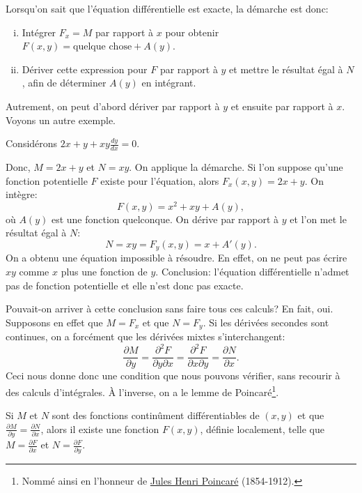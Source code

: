 Lorsqu'on sait que l'équation différentielle est exacte, la démarche est donc:
\begin{enumerate}[(i)]
	\item Intégrer $F_x = M$ par rapport à $x$ pour obtenir $F(x, y) = \text{quelque chose} + A(y)$.
	\item Dériver cette expression pour $F$ par rapport à $y$ et mettre le résultat égal à
			$N$, afin de déterminer $A(y)$ en intégrant.
\end{enumerate}
Autrement, on peut d'abord dériver par rapport à $y$ et ensuite par rapport à $x$.
Voyons un autre exemple.

\begin{example}
	Considérons $2x+y + xy \frac{dy}{dx} = 0$.

	Donc, $M = 2x+y$ et $N=xy$.  On applique la démarche.
	Si l'on suppose qu'une fonction potentielle $F$ existe pour l'équation, alors $F_x (x,y) = 2x+y$.
	On intègre:
	\begin{equation*}
		F(x,y) = x^2 + xy + A(y),
	\end{equation*}
	où $A(y)$ est une fonction quelconque. On dérive par rapport à $y$ et l'on met le résultat égal à $N$:
	\begin{equation*}
		N = xy = F_y (x,y) = x+A'(y) .
	\end{equation*}
	On a obtenu une équation impossible à résoudre.  En effet, on ne peut pas écrire $xy$ comme
	$x$ plus une fonction de $y$.
	Conclusion: l'équation différentielle n'admet pas de fonction potentielle et elle n'est donc pas exacte.
\end{example}

Pouvait-on arriver à cette conclusion sans faire tous ces calculs?  En fait, oui.  Supposons en effet que
$M = F_x$ et que 
$N = F_y$.  Si les dérivées secondes sont continues, on a forcément que les dérivées mixtes s'interchangent:
\begin{equation*}
	\frac{\partial M}{\partial y}
		= 	\frac{\partial^2 F}{\partial y \partial x}
		=	\frac{\partial^2 F}{\partial x \partial y}
		= 	\frac{\partial N}{\partial x} .
\end{equation*}
Ceci nous donne donc une condition que nous pouvons vérifier, sans recourir à des calculs d'intégrales.
À l'inverse, on a le lemme de Poincaré\footnote{Nommé ainsi en l'honneur de
\href{https://en.wikipedia.org/wiki/Henri_Poincar\%C3\%A9}{Jules Henri
Poincaré} (1854-1912).}.

\begin{theorem}[Poincaré]
Si $M$ et $N$ sont des fonctions continûment différentiables de $(x, y)$ et
que $\frac{\partial M}{\partial y} = \frac{\partial N}{\partial x}$,
alors il existe une fonction $F(x,y)$, définie localement, telle que $M = \frac{\partial F}{\partial x}$ et
$N = \frac{\partial F}{\partial y}$.
\end{theorem}

